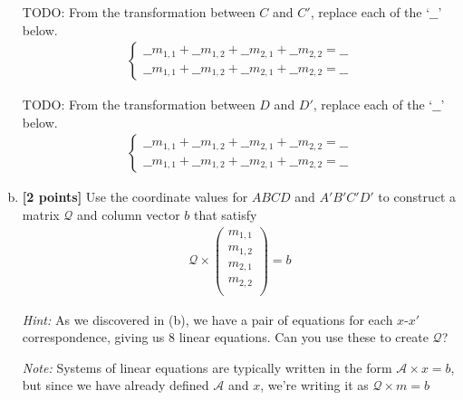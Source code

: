 \begin{enumerate}[(a)]
\begin{mdframed}
TODO: From the transformation between $C$ and $C'$, replace each of the `$\_\_$' below.
\begin{align*}
\begin{cases}
    \_\_m_{1,1} + \_\_m_{1,2} + \_\_m_{2,1} + \_\_m_{2,2} = \_\_
    \\\_\_m_{1,1} + \_\_m_{1,2} + \_\_m_{2,1} + \_\_m_{2,2} = \_\_
\end{cases}
\end{align*}
\end{mdframed}

\begin{mdframed}
TODO: From the transformation between $D$ and $D'$, replace each of the `$\_\_$' below.
\begin{align*}
\begin{cases}
    \_\_m_{1,1} + \_\_m_{1,2} + \_\_m_{2,1} + \_\_m_{2,2} = \_\_
    \\\_\_m_{1,1} + \_\_m_{1,2} + \_\_m_{2,1} + \_\_m_{2,2} = \_\_
\end{cases}
\end{align*}
\end{mdframed}

\item \textbf{[2 points]} Use the coordinate values for $ABCD$ and $A'B'C'D'$ to construct a matrix $\mathcal{Q}$ and column vector $b$ that satisfy
\begin{align*}
    \mathcal{Q} \times \begin{pmatrix} m_{1,1} \\ m_{1,2} \\ m_{2,1} \\ m_{2,2} \\ \end{pmatrix} = b
\end{align*}

\emph{Hint:} As we discovered in (b), we have a pair of equations for each $x$-$x'$ correspondence, giving us $8$ linear equations. Can you use these to create $\mathcal{Q}$?

\emph{Note:} Systems of linear equations are typically written in the form $\mathcal{A} \times x = b$, but since we have already defined $\mathcal{A}$ and $x$, we're writing it as $\mathcal{Q} \times m = b$


\end{enumerate}
